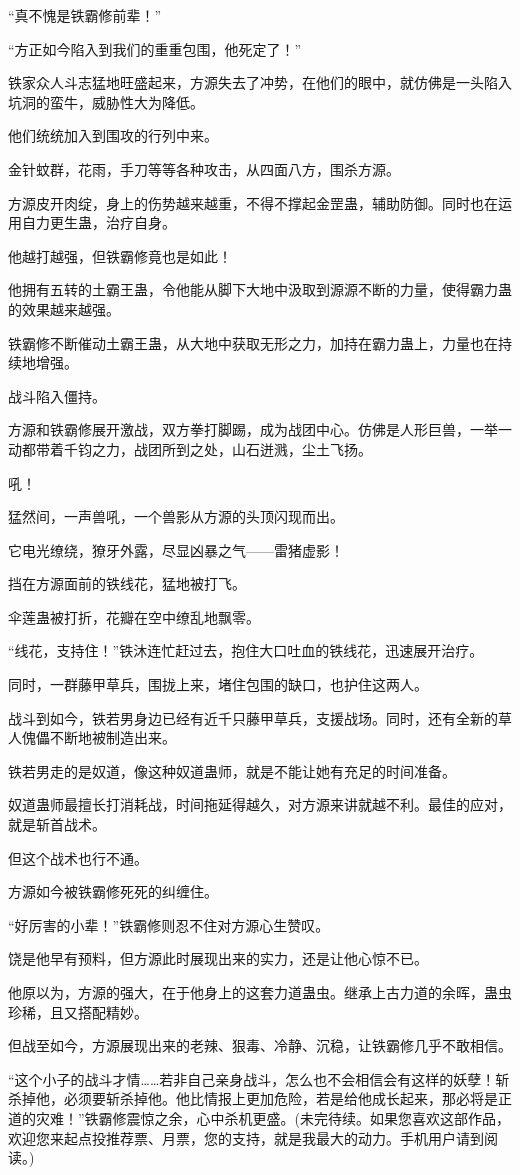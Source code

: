 \begin{this_body}
“真不愧是铁霸修前辈！”

“方正如今陷入到我们的重重包围，他死定了！”

铁家众人斗志猛地旺盛起来，方源失去了冲势，在他们的眼中，就仿佛是一头陷入坑洞的蛮牛，威胁性大为降低。

他们统统加入到围攻的行列中来。

金针蚊群，花雨，手刀等等各种攻击，从四面八方，围杀方源。

方源皮开肉绽，身上的伤势越来越重，不得不撑起金罡蛊，辅助防御。同时也在运用自力更生蛊，治疗自身。

他越打越强，但铁霸修竟也是如此！

他拥有五转的土霸王蛊，令他能从脚下大地中汲取到源源不断的力量，使得霸力蛊的效果越来越强。

铁霸修不断催动土霸王蛊，从大地中获取无形之力，加持在霸力蛊上，力量也在持续地增强。

战斗陷入僵持。

方源和铁霸修展开激战，双方拳打脚踢，成为战团中心。仿佛是人形巨兽，一举一动都带着千钧之力，战团所到之处，山石迸溅，尘土飞扬。

吼！

猛然间，一声兽吼，一个兽影从方源的头顶闪现而出。

它电光缭绕，獠牙外露，尽显凶暴之气——雷猪虚影！

挡在方源面前的铁线花，猛地被打飞。

伞莲蛊被打折，花瓣在空中缭乱地飘零。

“线花，支持住！”铁沐连忙赶过去，抱住大口吐血的铁线花，迅速展开治疗。

同时，一群藤甲草兵，围拢上来，堵住包围的缺口，也护住这两人。

战斗到如今，铁若男身边已经有近千只藤甲草兵，支援战场。同时，还有全新的草人傀儡不断地被制造出来。

铁若男走的是奴道，像这种奴道蛊师，就是不能让她有充足的时间准备。

奴道蛊师最擅长打消耗战，时间拖延得越久，对方源来讲就越不利。最佳的应对，就是斩首战术。

但这个战术也行不通。

方源如今被铁霸修死死的纠缠住。

“好厉害的小辈！”铁霸修则忍不住对方源心生赞叹。

饶是他早有预料，但方源此时展现出来的实力，还是让他心惊不已。

他原以为，方源的强大，在于他身上的这套力道蛊虫。继承上古力道的余晖，蛊虫珍稀，且又搭配精妙。

但战至如今，方源展现出来的老辣、狠毒、冷静、沉稳，让铁霸修几乎不敢相信。

“这个小子的战斗才情……若非自己亲身战斗，怎么也不会相信会有这样的妖孽！斩杀掉他，必须要斩杀掉他。他比情报上更加危险，若是给他成长起来，那必将是正道的灾难！”铁霸修震惊之余，心中杀机更盛。(未完待续。如果您喜欢这部作品，欢迎您来起点投推荐票、月票，您的支持，就是我最大的动力。手机用户请到阅读。)

\end{this_body}

